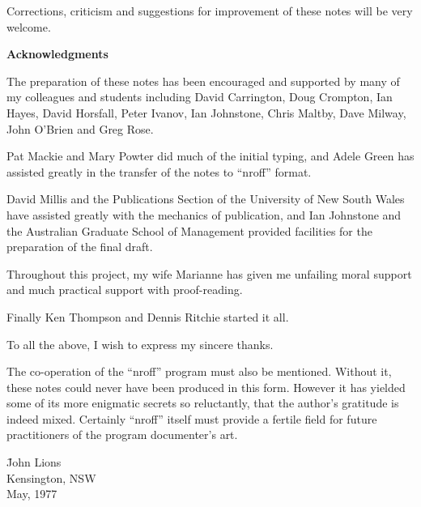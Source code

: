Corrections, criticism and suggestions
for improvement of these notes will be
very welcome.

\bigskip

{\noindent \large \bf Acknowledgments}

\smallskip

The preparation of these notes has been
encouraged and supported by many of my
colleagues and students including David
Carrington, Doug Crompton, Ian Hayes,
David Horsfall, Peter Ivanov, Ian Johnstone, Chris Maltby, Dave Milway, John
O'Brien and Greg Rose.

Pat Mackie and Mary Powter did much of
the initial typing, and Adele Green has
assisted greatly in the transfer of the
notes to ``nroff'' format.

David Millis and the Publications Section of the University of New South
Wales have assisted greatly with the
mechanics of publication, and Ian Johnstone and the Australian Graduate
School of Management provided facilities for the preparation of the final
draft.

Throughout this project, my wife
Marianne has given me unfailing moral
support and much practical support with
proof-reading.

Finally Ken Thompson and Dennis Ritchie
started it all.

To all the above, I wish to express my
sincere thanks.

The co-operation of the ``nroff'' program
must also be mentioned. Without it,
these notes could never have been produced in this form. However it has
yielded some of its more enigmatic
secrets so reluctantly, that the
author's gratitude is indeed mixed.
Certainly ``nroff'' itself must provide a
fertile field for future practitioners
of the program documenter's art.

\bt
\hspace{5cm} \= John Lions \\
\> Kensington, NSW \\
\> May, 1977 \\
\et
